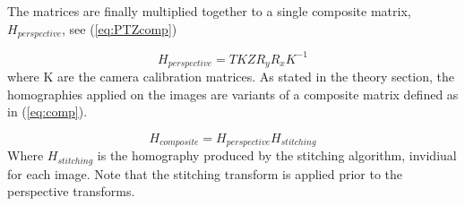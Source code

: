 	The matrices are finally multiplied together to a single composite matrix, $H_{perspective}$, see (\ref{eq:PTZcomp})

	\begin{equation}
		H_{perspective}=TKZR_yR_xK^{-1}
		\label{eq:PTZcomp}
	\end{equation}
	where K are the camera calibration matrices.
	As stated in the theory section, the homographies applied on the images are variants of a composite matrix defined as in (\ref{eq:comp}).

	\begin{equation}
		H_{composite}=H_{perspective}H_{stitching}
		\label{eq:comp}
	\end{equation}
	Where $H_{stitching}$ is the homography produced by the stitching algorithm, invidiual for each image. Note that the stitching transform is applied prior to the perspective transforms. %
